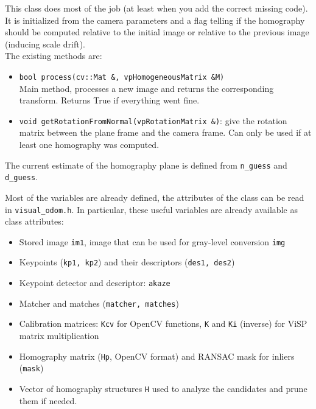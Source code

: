 \documentclass{ecnreport}
\begin{document}
This class does most of the job (at least when you add the correct missing code). It is initialized from the camera parameters and a flag telling if the homography
should be computed relative to the initial image or relative to the previous image (inducing scale drift).\\
The existing methods are:
\begin{itemize}
 \item \texttt{bool process(cv::Mat \&, vpHomogeneousMatrix \&M)} \\ 
 Main method, processes a new image and returns the corresponding transform. Returns True if everything went fine. 
 \item \texttt{void getRotationFromNormal(vpRotationMatrix \&)}: give the rotation matrix between the plane frame and the camera frame. Can only be used
 if at least one homography was computed.
\end{itemize}
The current estimate of the homography plane is defined from \texttt{n\_guess} and \texttt{d\_guess}.

Most of the variables are already defined, the attributes of the class can be read in \texttt{visual\_odom.h}. In particular, 
these useful variables are already available as class attributes:
\begin{itemize}
\item Stored image \texttt{im1}, image that can be used for gray-level conversion \texttt{img}
 \item Keypoints (\texttt{kp1, kp2}) and their descriptors (\texttt{des1, des2})
 \item Keypoint detector and descriptor: \texttt{akaze}
 \item Matcher and matches (\texttt{matcher, matches})
 \item Calibration matrices: \texttt{Kcv} for OpenCV functions, \texttt{K} and \texttt{Ki} (inverse) for ViSP matrix multiplication
 \item Homography matrix (\texttt{Hp}, OpenCV format) and RANSAC mask for inliers (\texttt{mask})
 \item Vector of homography structures \texttt{H} used to analyze the candidates and prune them if needed.
\end{itemize}
\end{document}
